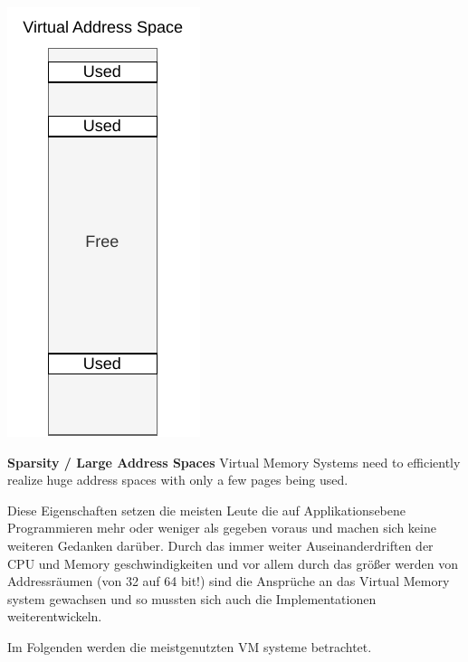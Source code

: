 \begin{marginfigure}
    \centering
    \includegraphics*[width=0.5\marginparwidth]{figures/fund_sparsity.pdf}
    \caption{\textbf{Sparsity / Large Address Spaces} Virtual Memory Systems need to efficiently
        realize huge address spaces with only a few pages being used.}
\end{marginfigure}





Diese Eigenschaften setzen die meisten Leute die auf Applikationsebene Programmieren mehr oder
weniger als gegeben voraus und machen sich keine weiteren Gedanken darüber.
Durch das immer weiter Auseinanderdriften der CPU und Memory geschwindigkeiten und vor allem
durch das größer werden von Addressräumen (von 32 auf 64 bit!)  sind die Ansprüche an
das Virtual Memory system gewachsen und so mussten sich auch die Implementationen weiterentwickeln.

Im Folgenden werden die meistgenutzten VM systeme betrachtet.

